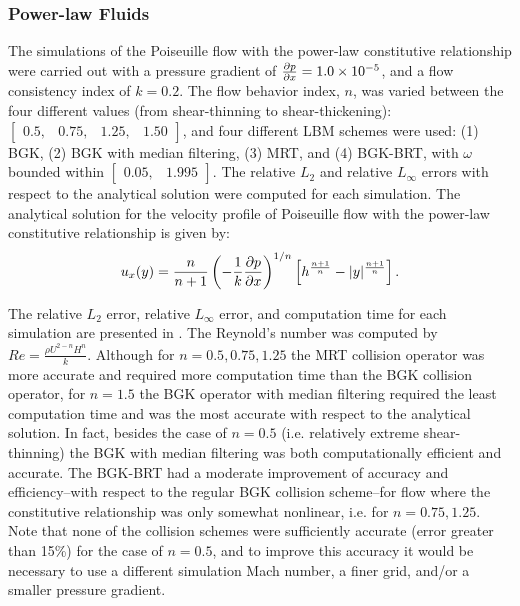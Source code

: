 \subsubsection{Power-law Fluids} \label{sec:poise-powerlaw}

The simulations of the Poiseuille flow with the power-law constitutive relationship were carried out with a pressure gradient of $\frac{\partial p}{\partial x} = 1.0 \times 10^{-5}$, and a flow consistency index of $k = 0.2$.
The flow behavior index, $n$, was varied between the four different values (from shear-thinning to shear-thickening): $\begin{bmatrix}0.5,&0.75,&1.25,& 1.50\end{bmatrix}$, and four different LBM schemes were used: (1) BGK, (2) BGK with median filtering, (3) MRT, and (4) BGK-BRT, with $\omega$ bounded within $\begin{bmatrix}0.05,&1.995\end{bmatrix}$. 
The relative $L_2$ and relative $L_{\infty}$ errors with respect to the analytical solution were computed for each simulation.
The analytical solution for the velocity profile of Poiseuille flow with the power-law constitutive relationship is given by:
\begin{equation} \label{eq:analytical-power-law}
  u_x(y) = \frac{n}{n+1}\left(-\frac{1}{k}\frac{\partial p}{\partial x}\right)^{1/n}\left[h^{\frac{n+1}{n}} - |y|^{\frac{n+1}{n}}\right].
\end{equation}

The relative $L_2$ error, relative $L_{\infty}$ error, and computation time for each simulation are presented in .
The Reynold's number was computed by $Re = \frac{\rho U^{2-n} H^n}{k}$.
Although for $n = 0.5, 0.75, 1.25$ the MRT collision operator was more accurate and required more computation time than the BGK collision operator, for $n = 1.5$ the BGK operator with median filtering required the least computation time and was the most accurate with respect to the analytical solution.
In fact, besides the case of $n = 0.5$ (i.e. relatively extreme shear-thinning) the BGK with median filtering was both computationally efficient and accurate.
The BGK-BRT had a moderate improvement of accuracy and efficiency--with respect to the regular BGK collision scheme--for flow where the constitutive relationship was only somewhat nonlinear, i.e. for $n = 0.75, 1.25$.
Note that none of the collision schemes were sufficiently accurate (error greater than 15\%) for the case of $n = 0.5$, and to improve this accuracy it would be necessary to use a different simulation Mach number, a finer grid, and/or a smaller pressure gradient.

